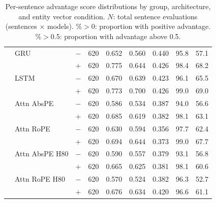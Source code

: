 \begin{table}[t]
\begin{tabular}{@{}lllrrrrrr@{}}
\addlinespace[1pt]
 & GRU & $-$ & 620 & 0.652 & 0.560 & 0.440 & 95.8 & 57.1 \\
 &  & $+$ & 620 & 0.775 & 0.644 & 0.426 & 98.4 & 68.2 \\
\addlinespace[1pt]
 & LSTM & $-$ & 620 & 0.670 & 0.639 & 0.423 & 96.1 & 65.5 \\
 &  & $+$ & 620 & 0.773 & 0.700 & 0.426 & 99.0 & 69.0 \\
\addlinespace[1pt]
 & Attn AbsPE & $-$ & 620 & 0.586 & 0.534 & 0.387 & 94.0 & 56.6 \\
 &  & $+$ & 620 & 0.685 & 0.619 & 0.382 & 98.1 & 63.1 \\
\addlinespace[1pt]
 & Attn RoPE & $-$ & 620 & 0.630 & 0.594 & 0.356 & 97.7 & 62.4 \\
 &  & $+$ & 620 & 0.694 & 0.644 & 0.373 & 99.0 & 67.7 \\
\addlinespace[1pt]
 & Attn AbsPE H80 & $-$ & 620 & 0.590 & 0.557 & 0.379 & 93.1 & 56.8 \\
 &  & $+$ & 620 & 0.665 & 0.625 & 0.381 & 98.1 & 60.6 \\
\addlinespace[1pt]
 & Attn RoPE H80 & $-$ & 620 & 0.570 & 0.524 & 0.382 & 96.3 & 52.7 \\
 &  & $+$ & 620 & 0.676 & 0.634 & 0.420 & 96.6 & 61.1 \\
\bottomrule
\end{tabular}
\caption{Per-sentence advantage score distributions by group, architecture, and entity vector condition. $N$: total sentence evaluations (sentences $\times$ models). \%${>}$0: proportion with positive advantage. \%${>}$0.5: proportion with advantage above 0.5.}
\label{tab:advantage_distributions_test}
\end{table}
